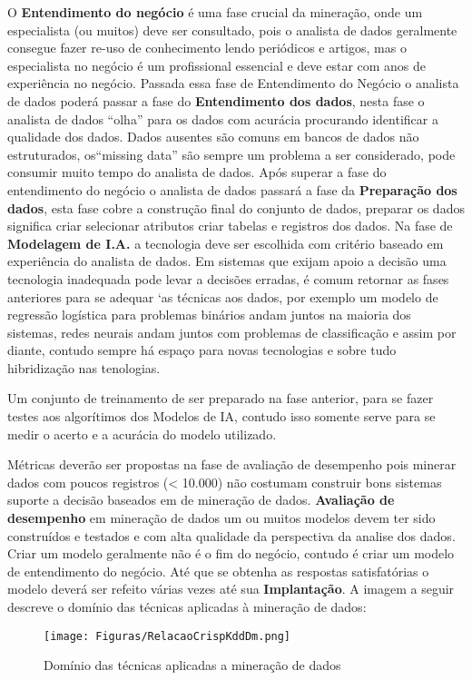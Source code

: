 \documentclass[conference,compsoc]{IEEEtran}
\begin{document}
O \textbf{Entendimento do negócio} é uma fase crucial da mineração, onde um especialista (ou muitos) deve ser consultado, pois o analista de dados geralmente consegue fazer re-uso de conhecimento lendo periódicos e artigos, mas o especialista no negócio é um profissional essencial e deve estar com anos de experiência no negócio.
Passada essa fase de Entendimento do Negócio o analista de dados poderá passar a fase do \textbf{Entendimento dos dados}, nesta fase o analista de dados ``olha'' para os dados com acurácia procurando identificar a qualidade dos dados. Dados ausentes são comuns em bancos de dados não estruturados, os``missing data'' são sempre um problema a ser considerado, pode consumir muito tempo do analista de dados. 
Após superar a fase do entendimento do negócio o analista de dados passará a fase da \textbf{Preparação dos dados}, esta fase cobre a construção final do conjunto de dados, preparar os dados significa criar selecionar atributos criar tabelas e registros dos dados. 
Na fase de \textbf{Modelagem de I.A.} a tecnologia deve ser escolhida com critério baseado em experiência do analista de dados. Em sistemas que exijam apoio a decisão uma tecnologia inadequada pode levar a decisões erradas, é comum retornar as fases anteriores para se adequar `as técnicas aos dados, por exemplo um modelo de regressão logística para problemas binários andam juntos na maioria dos sistemas, redes neurais andam juntos com problemas de classificação e assim por diante, contudo sempre há espaço para novas tecnologias e sobre tudo hibridização nas tenologias.


Um conjunto de treinamento de ser preparado na fase anterior, para se fazer testes aos algorítimos dos Modelos de IA, contudo isso somente serve para se medir o acerto e a acurácia do modelo utilizado.

Métricas deverão ser propostas na fase de avaliação de desempenho pois minerar dados com poucos registros (< 10.000) não costumam construir bons sistemas suporte a decisão baseados em de mineração de dados.
\textbf{Avaliação de desempenho} em mineração de dados um ou muitos modelos devem ter sido construídos e testados e com alta qualidade da perspectiva da analise  dos dados.
Criar um modelo geralmente não é o fim do negócio, contudo é criar um modelo de entendimento do negócio. Até que se obtenha as respostas satisfatórias o modelo deverá ser refeito várias vezes até sua \textbf{Implantação}. A imagem a seguir descreve o domínio das técnicas aplicadas à mineração de dados:

\begin{figure}[!ht]
\centering
\caption{Domínio das técnicas aplicadas a mineração de dados}
\flushleft
\texttt{[image: Figuras/RelacaoCrispKddDm.png]}
\end{figure}
\end{document}
